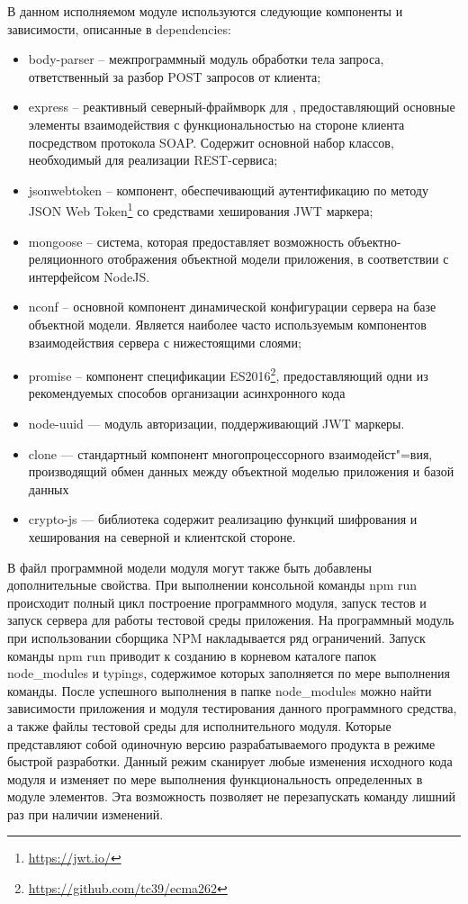 В данном исполняемом модуле используются следующие компоненты и зависимости, описанные в dependencies:
\begin{itemize}
  \item body-parser – межпрограммный модуль обработки тела запроса, ответственный за разбор POST запросов от клиента;
  \item express – реактивный северный-фраймворк для \nodejs{}, предоставляющий основные элементы взаимодействия с функциональностью на стороне клиента посредством протокола SOAP. Содержит основной набор классов, необходимый для реализации REST-сервиса;
  \item jsonwebtoken – компонент, обеспечивающий аутентификацию по методу JSON Web Token\footnote{\url{https://jwt.io/}} со средствами хеширования JWT маркера;
  \item mongoose – система, которая предоставляет возможность объектно-реляционного отображения объектной модели приложения, в соответствии с интерфейсом NodeJS.
  \item nconf – основной компонент динамической конфигурации сервера на базе объектной модели. Является наиболее часто используемым компонентов взаимодействия сервера с нижестоящими слоями;
  \item promise – компонент спецификации ES2016\footnote{\url{https://github.com/tc39/ecma262}}, предоставляющий одни из рекомендуемых способов организации асинхронного кода
  \item node-uuid — модуль авторизации, поддерживающий JWT маркеры.
  \item clone — стандартный компонент многопроцессорного взаимодейст"=вия, производящий обмен данных между объектной моделью приложения и базой данных
  \item crypto-js — библиотека содержит реализацию функций шифрования и хеширования на северной и клиентской стороне.
\end{itemize}

В файл программной модели модуля могут также быть добавлены дополнительные свойства. При выполнении консольной команды npm run происходит полный цикл построение программного модуля, запуск тестов и запуск сервера \nodejs{} для работы тестовой среды приложения.
На программный модуль при использовании сборщика NPM накладывается ряд ограничений. Запуск команды npm run приводит к созданию в корневом каталоге папок node\_modules и typings, содержимое которых заполняется по мере выполнения команды. После успешного выполнения в папке node\_modules можно найти зависимости приложения и модуля тестирования данного программного средства, а также файлы тестовой среды для исполнительного модуля. Которые представляют собой одиночную версию разрабатываемого продукта в режиме быстрой разработки. Данный режим сканирует любые изменения исходного кода модуля и изменяет по мере выполнения функциональность определенных в модуле элементов. Эта возможность позволяет не перезапускать команду лишний раз при наличии изменений.

